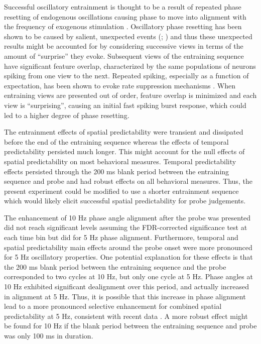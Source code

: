 \documentclass[dwyatte_dissertation.tex]{subfiles}
\begin{document}
Successful oscillatory entrainment is thought to be a result of repeated phase resetting of endogenous oscillations causing phase to move into alignment with the frequency of exogenous stimulation \cite{SchroederLakatosKajikawaEtAl08,CalderoneLakatosButlerEtAlInPress}. Oscillatory phase resetting has been shown to be caused by salient, unexpected events (; ) and thus these unexpected results might be accounted for by considering successive views in terms of the amount of ``surprise'' \cite{IttiBaldi09,MeyerOlson11} they evoke. Subsequent views of the entraining sequence have significant feature overlap, characterized by the same populations of neurons spiking from one view to the next. Repeated spiking, especially as a function of expectation, has been shown to evoke rate suppression mechanisms \cite{SummerfieldTrittschuhMontiEtAl08}. When entraining views are presented out of order, feature overlap is minimized and each view is ``surprising'', causing an initial fast spiking burst response, which could led to a higher degree of phase resetting.

The entrainment effects of spatial predictability were transient and dissipated before the end of the entraining sequence whereas the effects of temporal predictability persisted much longer. This might account for the null effects of spatial predictability on most behavioral measures. Temporal predictability effects persisted through the 200 ms blank period between the entraining sequence and probe and had robust effects on all behavioral measures. Thus, the present experiment could be modified to use a shorter entrainment sequence which would likely elicit successful spatial predictability for probe judgements.

The enhancement of 10 Hz phase angle alignment after the probe was presented did not reach significant levels assuming the FDR-corrected significance test at each time bin but did for 5 Hz phase alignment. Furthermore, temporal and spatial predictability main effects around the probe onset were more pronounced for 5 Hz oscillatory properties. One potential explanation for these effects is that the 200 ms blank period between the entraining sequence and the probe corresponded to two cycles at 10 Hz, but only one cycle at 5 Hz. Phase angles at 10 Hz exhibited significant dealignment over this period, and actually increased in alignment at 5 Hz. Thus, it is possible that this increase in phase alignment lead to a more pronounced selective enhancement for combined spatial predictability at 5 Hz, consistent with recent data \cite{CravoRohenkohlWyartEtAl13}. A more robust effect might be found for 10 Hz if the blank period between the entraining sequence and probe was only 100 ms in duration.
\end{document}
